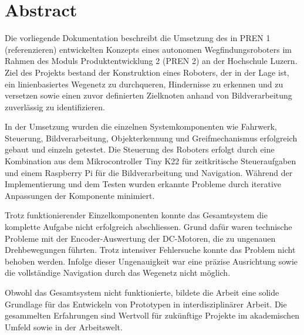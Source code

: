 \section*{Abstract}


Die vorliegende Dokumentation beschreibt die Umsetzung des in PREN 1 (referenzieren) entwickelten Konzepts eines autonomen Wegfindungsroboters im Rahmen des Moduls Produktentwicklung 2 (PREN 2) an der Hochschule Luzern. Ziel des Projekts bestand der Konstruktion eines Roboters, der in der Lage ist, ein linienbasiertes Wegenetz zu durchqueren, Hindernisse zu erkennen und zu versetzen sowie einen zuvor definierten Zielknoten anhand von Bildverarbeitung zuverlässig zu identifizieren.

In der Umsetzung wurden die einzelnen Systemkomponenten wie Fahrwerk, Steuerung, Bildverarbeitung, Objekterkennung und Greifmechanismus erfolgreich gebaut und einzeln getestet. Die Steuerung des Roboters erfolgt durch eine Kombination aus dem Mikrocontroller Tiny K22 für zeitkritische Steueraufgaben und einem Raspberry Pi für die Bildverarbeitung und Navigation. Während der Implementierung und dem Testen wurden erkannte Probleme durch iterative Anpassungen der Komponente minimiert.


Trotz funktionierender Einzelkomponenten konnte das Gesamtsystem die komplette Aufgabe nicht erfolgreich abschliessen. Grund dafür waren technische Probleme mit der Encoder-Auswertung der DC-Motoren, die zu ungenauen Drehbewegungen führten. Trotz intensiver Fehlersuche konnte das Problem nicht behoben werden. Infolge dieser Ungenauigkeit war eine präzise Ausrichtung sowie die vollständige Navigation durch das Wegenetz nicht möglich.


Obwohl das Gesamtsystem nicht funktionierte, bildete die Arbeit eine solide Grundlage für das Entwickeln von Prototypen in interdisziplinärer Arbeit. Die gesammelten Erfahrungen sind Wertvoll für zukünftige Projekte im akademischen Umfeld sowie in der Arbeitswelt.


